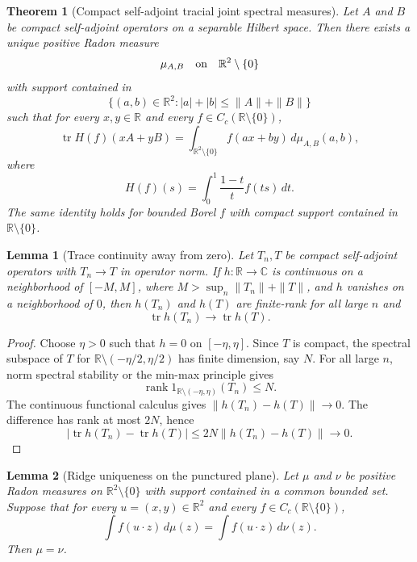 \documentclass[11pt]{article}
\newtheorem{theorem}{Theorem}
\newtheorem{lemma}{Lemma}
\newcommand{\R}{\mathbb R}
\newcommand{\C}{\mathbb C}
\newcommand{\tr}{\operatorname{tr}}
\newcommand{\rank}{\operatorname{rank}}
\begin{document}
\begin{theorem}[Compact self-adjoint tracial joint spectral measures]\label{thm:main}
Let $A$ and $B$ be compact self-adjoint operators on a separable Hilbert space.
Then there exists a unique positive Radon measure
\[
  \mu_{A,B}\quad\hbox{on}\quad \R^2\setminus\{0\}
\]
with support contained in
\[
  \{(a,b)\in\R^2: |a|+|b|\le \|A\|+\|B\|\}
\]
such that for every $x,y\in\R$ and every $f\in C_c(\R\setminus\{0\})$,
\begin{equation}\label{eq:compact-identity}
  \tr H(f)(xA+yB)
  =\int_{\R^2\setminus\{0\}} f(ax+by)\,d\mu_{A,B}(a,b),
\end{equation}
where
\[
  H(f)(s)=\int_0^1 \frac{1-t}{t}f(ts)\,dt.
\]
The same identity holds for bounded Borel $f$ with compact support contained
in $\R\setminus\{0\}$.
\end{theorem}

\begin{lemma}[Trace continuity away from zero]\label{lem:trace-continuity}
Let $T_n,T$ be compact self-adjoint operators with $T_n\to T$ in operator
norm.  If $h:\R\to\C$ is continuous on a neighborhood of
$[-M,M]$, where $M>\sup_n\|T_n\|+\|T\|$, and $h$ vanishes on a neighborhood of
$0$, then $h(T_n)$ and $h(T)$ are finite-rank for all large $n$ and
\[
  \tr h(T_n)\to \tr h(T).
\]
\end{lemma}

\begin{proof}
Choose $\eta>0$ such that $h=0$ on $[-\eta,\eta]$.  Since $T$ is compact, the
spectral subspace of $T$ for $\R\setminus(-\eta/2,\eta/2)$ has finite
dimension, say $N$.  For all large $n$, norm spectral stability or the
min-max principle gives
\[
  \rank 1_{\R\setminus(-\eta,\eta)}(T_n)\le N.
\]
The continuous functional calculus gives $\|h(T_n)-h(T)\|\to0$.  The
difference has rank at most $2N$, hence
\[
  |\tr h(T_n)-\tr h(T)|
  \le 2N\|h(T_n)-h(T)\|\to0 .
\]
\end{proof}

\begin{lemma}[Ridge uniqueness on the punctured plane]\label{lem:ridge}
Let $\mu$ and $\nu$ be positive Radon measures on $\R^2\setminus\{0\}$ with
support contained in a common bounded set.  Suppose that for every
$u=(x,y)\in\R^2$ and every $f\in C_c(\R\setminus\{0\})$,
\[
  \int f(u\cdot z)\,d\mu(z)=\int f(u\cdot z)\,d\nu(z).
\]
Then $\mu=\nu$.
\end{lemma}
\end{document}
